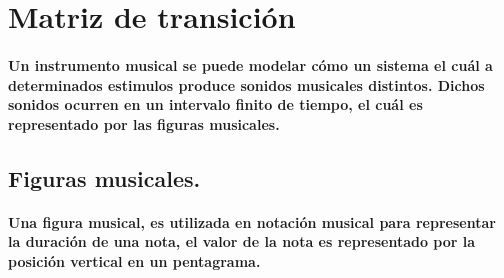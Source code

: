 
\section{Matriz de transición}

    \paragraph{Un instrumento musical se puede modelar cómo un sistema el cuál a determinados estimulos produce sonidos musicales distintos. Dichos sonidos ocurren en un intervalo finito de tiempo, el cuál es representado por las figuras musicales.}
    
    \subsection{Figuras musicales.}
        \paragraph{Una figura musical, es utilizada en notación musical para representar la duración de una nota, el valor de la nota es representado por la posición vertical en un pentagrama.}
